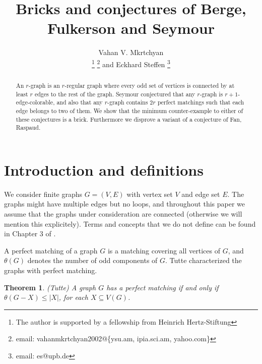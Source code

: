 \documentclass[fleqn,12pt]{article}
\newtheorem{theorem}{Theorem}
\begin{document}
\title{Bricks and conjectures of Berge, Fulkerson and Seymour}

\author{Vahan V. Mkrtchyan\address[MCSD]{Paderborn Institute for Advanced Studies in Computer Science and Engineering,
Paderborn University, Warburger Str. 100, 33098 Paderborn, Germany}\thanks{The author is supported by a fellowship from Heinrich Hertz-Stiftung}
\thanks{email: vahanmkrtchyan2002@\{ysu.am, ipia.sci.am,
yahoo.com\}}
                        and
        Eckhard Steffen \addressmark[MCSD]\thanks{email: es@upb.de}}



\maketitle

\begin{abstract}
An $r$-graph is an $r$-regular graph where every odd set of vertices is connected by at least $r$ edges to the rest of the graph. Seymour conjectured that any $r$-graph is $r+1$-edge-colorable, 
and also that any $r$-graph contains $2r$ perfect matchings such that each edge belongs to two of them. We show that the minimum counter-example to either of these conjectures is a brick.
Furthermore we disprove a variant of a conjecture of Fan, Raspaud. 
\end{abstract}


\section{Introduction and definitions}

We consider finite graphs $G=(V,E)$ with vertex set $V$ and edge set $E$. The graphs might have multiple 
edges but no loops, and throughout this paper we assume that the graphs under consideration are connected (otherwise we will mention this explicitely). 
Terms and concepts that we do not define can be found in Chapter 3 of \cite{Handbook}.

A perfect matching of a graph $G$ is a matching covering all vertices of $G$, and $\theta(G)$ denotes the number of odd components of $G$.  
Tutte characterized the graphs with perfect matching.

\begin{theorem}\label{Tutte}(Tutte) A graph $G$ has a perfect matching if and only if $\theta(G-X) \leq |X|$, for each $X\subseteq V(G)$.
\end{theorem}
\end{document}
